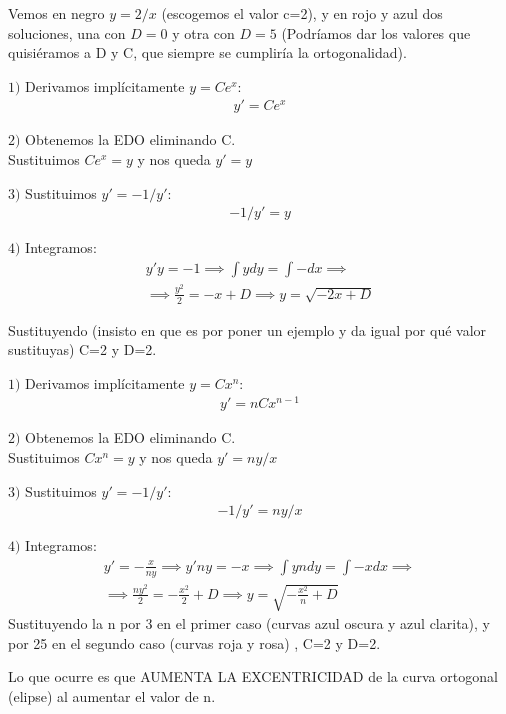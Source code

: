 \documentclass[nochap]{apuntes}
\begin{document}
\begin{problem}[8]
Vemos en negro $y=2/x$ (escogemos el valor c=2), y en rojo y azul dos soluciones, una con $D=0$ y otra con $D=5$ (Podríamos dar los valores que quisiéramos a D y C, que siempre se cumpliría la ortogonalidad).



\spart
$1)$ Derivamos implícitamente $y=Ce^x$:
\begin{gather*}
y'=Ce^x
\end{gather*}

$2)$ Obtenemos la EDO eliminando C.\\
Sustituimos $Ce^x=y$ y nos queda $y'=y$

$3)$ Sustituimos  $y'=-1/y'$:
\begin{gather*}
-1/y'=y
\end{gather*}

$4)$ Integramos:
\begin{gather*}
y'y=-1 \implies \int ydy=\int -dx \implies \\ \implies \frac{y^2}{2}=-x+D \implies y=\sqrt{-2x+D}
\end{gather*}

Sustituyendo (insisto en que es por poner un ejemplo y da igual por qué valor sustituyas) C=2 y D=2.
\newpage

\spart
$1)$ Derivamos implícitamente $y=Cx^n$:
\begin{gather*}
y'=nCx^{n-1}
\end{gather*}

$2)$ Obtenemos la EDO eliminando C.\\
Sustituimos $Cx^n=y$ y nos queda $y'=ny/x$

$3)$ Sustituimos  $y'=-1/y'$:
\begin{gather*}
-1/y'=ny/x
\end{gather*}

$4)$ Integramos:
\begin{gather*}
y'=-\frac{x}{ny} \implies y'ny=-x  \implies \int yndy=\int -xdx \implies \\ \implies \frac{ny^2}{2}=-\frac{x^2}{2}+D \implies y=\sqrt{-\frac{x^2}{n}+D}
\end{gather*}
Sustituyendo la n por 3 en el primer caso (curvas azul oscura y azul clarita), y por 25 en el segundo caso (curvas roja y rosa) , C=2 y D=2.
\end{problem}
Lo que ocurre es que AUMENTA LA EXCENTRICIDAD de la curva ortogonal (elipse) al aumentar el valor de n.
\end{document}
